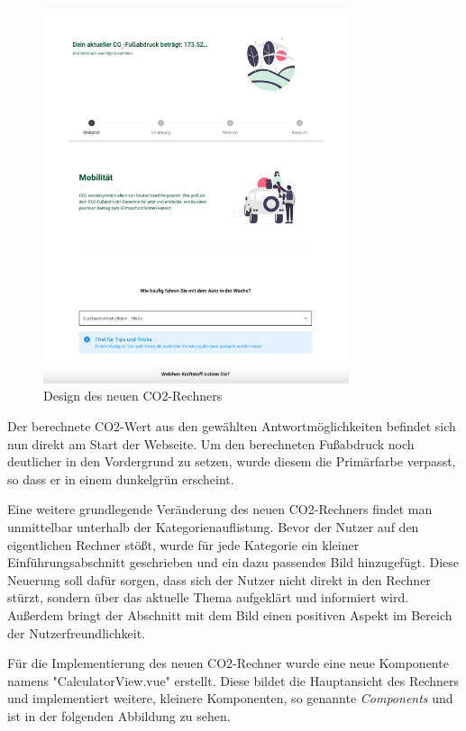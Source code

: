 \begin{figure}[H]
    \centering
    \includegraphics[width=0.8\textwidth]{images/06/Calculator_New_Design.png}
    \caption{Design des neuen CO2-Rechners}
    \label{fig:new-co2runter-calculator-design}
\end{figure}

Der berechnete CO2-Wert aus den gewählten Antwortmöglichkeiten befindet sich nun direkt am Start der Webseite.
Um den berechneten Fußabdruck noch deutlicher in den Vordergrund zu setzen, wurde diesem die Primärfarbe verpasst, so dass er in einem dunkelgrün erscheint.

Eine weitere grundlegende Veränderung des neuen CO2-Rechners findet man unmittelbar unterhalb der Kategorienauflistung.
Bevor der Nutzer auf den eigentlichen Rechner stößt, wurde für jede Kategorie ein kleiner Einführungsabschnitt geschrieben und ein dazu passendes Bild hinzugefügt.
Diese Neuerung soll dafür sorgen, dass sich der Nutzer nicht direkt in den Rechner stürzt, sondern über das aktuelle Thema aufgeklärt und informiert wird.
Außerdem bringt der Abschnitt mit dem Bild einen positiven Aspekt im Bereich der Nutzerfreundlichkeit.

Für die Implementierung des neuen CO2-Rechner wurde eine neue Komponente namens "CalculatorView.vue" erstellt.
Diese bildet die Hauptansicht des Rechners und implementiert weitere, kleinere Komponenten, so genannte \textit{Components} und ist in der folgenden Abbildung zu sehen.

